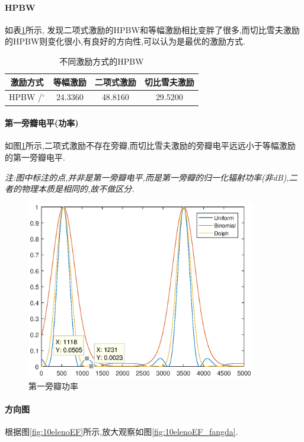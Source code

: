 \paragraph{HPBW}

如表\ref{tab:hpbw}所示, 发现二项式激励的HPBW和等幅激励相比变胖了很多,而切比雪夫激励的HPBW则变化很小,有良好的方向性,可以认为是最优的激励方式.
\begin{table}[!ht]
	\centering
	\begin{tabular}{c|ccc}
		\toprule
		激励方式&等幅激励&二项式激励&切比雪夫激励\\
		\midrule
		HPBW /$^\circ$&24.3360  &48.8160 &  29.5200\\
		\bottomrule
	\end{tabular}
	\caption{不同激励方式的HPBW} \label{tab:hpbw}
\end{table}

\paragraph{第一旁瓣电平(功率)}
如图\ref{fig:LobeValue}所示,二项式激励不存在旁瓣,而切比雪夫激励的旁瓣电平远远小于等幅激励的第一旁瓣电平.

\textit{注:图中标注的点,并非是第一旁瓣电平,而是第一旁瓣的归一化辐射功率(非dB),二者的物理本质是相同的,故不做区分. }
\begin{figure}[!ht]
	\centering
	\includegraphics[width=10cm]{TenEle_without_EF_lobeValue.eps}
	\caption{第一旁瓣功率} \label{fig:LobeValue}
\end{figure}


\paragraph{方向图}


根据图\ref{fig:10elenoEF}所示,放大观察如图\ref{fig:10elenoEF_fangda}.

